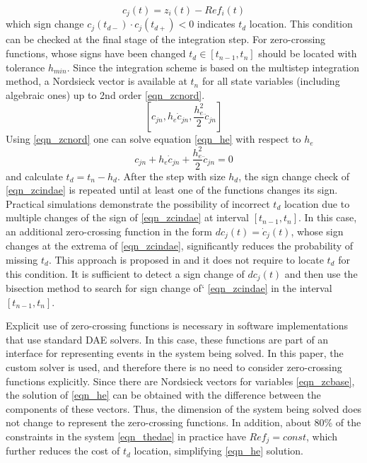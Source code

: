 \documentclass[lettersize,journal]{IEEEtran}
\begin{document}
\begin{equation}
	\label{eqn_zcindae}
	c_j(t)=z_i(t)-Ref_i(t)
\end{equation}
\noindent which sign change \(c_j(t_{d-}) \cdot c_j(t_{d+}) < 0 \) indicates \(t_d\) location. This condition can be checked at the final stage of the integration step.
For zero-crossing functions, whose signs have been changed \(t_d \in [t_{n-1}, t_n]\) should be located with tolerance \(h_{min}\). Since the integration scheme is based on the multistep integration method, a Nordsieck vector is available at \(t_n\) for all state variables (including algebraic ones) up to 2nd order \eqref{eqn_zcnord}.
\begin{equation}
	\label{eqn_zcnord}
	\left[ c_{jn}, h_e\dot{c}_{jn}, \frac{h_e^2}{2}\ddot{c}_{jn}\right]
\end{equation}
Using \eqref{eqn_zcnord} one can solve equation \eqref{eqn_he} with respect to \(h_e\)
\begin{equation}
	\label{eqn_he}
	c_{jn}+h_e\dot{c}_{jn}+\frac{h_e^2}{2}\ddot{c}_{jn} = 0
\end{equation}
\noindent and calculate \(t_d = t_n - h_d\). After the step with size \(h_d\), the sign change check of \eqref{eqn_zcindae}  is repeated until at least one of the functions changes its sign.
Practical simulations demonstrate the possibility of incorrect \(t_d\) location due to multiple changes of the sign of \eqref{eqn_zcindae} at interval \(\left[t_{n-1},t_n\right]\). In this case, an additional zero-crossing function in the form \(dc_j(t)=\dot{c}_j(t)\), whose sign changes at the extrema of \eqref{eqn_zcindae}, significantly reduces the probability of missing \(t_d\). This approach is proposed in \cite{cellier06} and it does not require to locate \(t_d\) for this condition. It is sufficient to detect a sign change of \(dc_j(t)\) and then use the bisection method to search for sign change of` \eqref{eqn_zcindae} in the interval \(\left[t_{n-1},t_n\right]\).

Explicit use of zero-crossing functions is necessary in software implementations that use standard DAE solvers. In this case, these functions are part of an interface for representing events in the system being solved. In this paper, the custom solver is used, and therefore there is no need to consider zero-crossing functions explicitly. Since there are Nordsieck vectors for variables \eqref{eqn_zcbase}, the solution of \eqref{eqn_he} can be obtained with the difference between the components of these vectors. Thus, the dimension of the system being solved does not change to represent the zero-crossing functions. In addition, about 80\% of the constraints in the system \eqref{eqn_thedae} in practice have \(Ref_j=const\), which further reduces the cost of \(t_d\) location, simplifying \eqref{eqn_he} solution.
\end{document}
